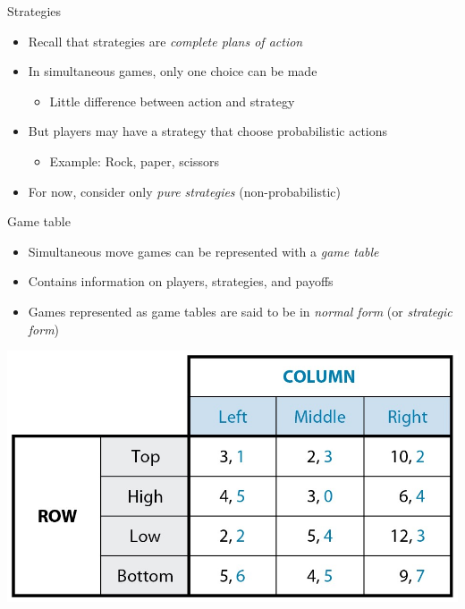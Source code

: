 \documentclass[10pt]{beamer}
\begin{document}
\begin{frame}[label={sec:orgcde33fe}]{}
\alert{Strategies}
\begin{itemize}
\item Recall that strategies are \emph{complete plans of action}
\item In simultaneous games, only one choice can be made
\begin{itemize}
\item Little difference between action and strategy
\end{itemize}
\item But players may have a strategy that choose probabilistic actions
\begin{itemize}
\item Example: Rock, paper, scissors
\end{itemize}
\item For now, consider only \emph{pure strategies} (non-probabilistic)
\end{itemize}
\end{frame}

\begin{frame}[label={sec:orgf4bc3cb}]{}
\alert{Game table}
\begin{itemize}
\item Simultaneous move games can be represented with a \emph{game table}
\item Contains information on players, strategies, and payoffs
\item Games represented as game tables are said to be in \emph{normal form} (or \emph{strategic form})
\end{itemize}
\end{frame}

\begin{frame}[label={sec:org0555a5e}]{}
\begin{center}
\includegraphics[width=.75\textwidth]{./img/GAMES4_FIG04.01.jpg}
\end{center}
\end{frame}
\end{document}
